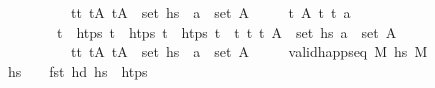 \begin{isabellebody}
\ \ \ \ \ \ \ \ \ \ \ \ \ \ {\isasymexists}t{\isacharprime}{\kern0pt}{\isasymin}{\isacharbraceleft}{\kern0pt}t\ tA{\isacharprime}{\kern0pt}{\isachardot}{\kern0pt}\ {\isacharparenleft}{\kern0pt}t{\isacharprime}{\kern0pt}{\isacharcomma}{\kern0pt}A{\isacharprime}{\kern0pt}{\isacharparenright}{\kern0pt}\ {\isasymin}\ set\ hs{\isacharprime}{\kern0pt}\ {\isasymand}\ a\ {\isasymin}\ set\ A{\isacharprime}{\kern0pt}{\isachardoublequoteclose}\isanewline
\ \ \ \ \ {\isachardoublequoteopen}{\isasymAnd}t\ A\ t\ t\ a{\isachardot}{\kern0pt}\isanewline
\ \ \ \ \ \ \ \ \ \ \ \ {\isasymlbrakk}t\ {\isasymnotin}\ htps{\isacharsemicolon}{\kern0pt}\ t\ {\isasymin}\ htps{\isacharsemicolon}{\kern0pt}\ t\ {\isasymin}\ htps{\isacharsemicolon}{\kern0pt}\ t\ {\isasymin}\ {\isacharbraceleft}{\kern0pt}t\ t\ {\isacharparenleft}{\kern0pt}t{\isacharcomma}{\kern0pt}\ A{\isacharparenright}{\kern0pt}\ {\isasymin}\ set\ hs{\isacharprime}{\kern0pt}{\isacharsemicolon}{\kern0pt}\ a\ {\isasymin}\ set\ A{\isasymrbrakk}\ {\isasymLongrightarrow}\ \isanewline
\ \ \ \ \ \ \ \ \ \ \ \ \ \ {\isasymexists}t{\isacharprime}{\kern0pt}{\isasymin}{\isacharbraceleft}{\kern0pt}t\ tA{\isacharprime}{\kern0pt}{\isachardot}{\kern0pt}\ {\isacharparenleft}{\kern0pt}t{\isacharprime}{\kern0pt}{\isacharcomma}{\kern0pt}A{\isacharprime}{\kern0pt}{\isacharparenright}{\kern0pt}\ {\isasymin}\ set\ hs\ {\isasymand}\ a\ {\isasymin}\ set\ A{\isacharprime}{\kern0pt}{\isachardoublequoteclose}\isanewline
\ \ \ \ \ {\isachardoublequoteopen}valid{\isacharunderscore}{\kern0pt}happ{\isacharunderscore}{\kern0pt}seq\ M\ hs\ M{\isacharprime}{\kern0pt}{\isachardoublequoteclose}\isanewline
\ \ \ \ \ {\isachardoublequoteopen}hs\ {\isasymnoteq}\ {\isacharbrackleft}{\kern0pt}{\isacharbrackright}{\kern0pt}\ {\isasymLongrightarrow}\ {\isacharparenleft}{\kern0pt}fst\ {\isacharparenleft}{\kern0pt}hd\ hs{\isacharparenright}{\kern0pt}{\isacharparenright}{\kern0pt}\ {\isasymin}\ htps{\isachardoublequoteclose}\isanewline

\end{isabellebody}
